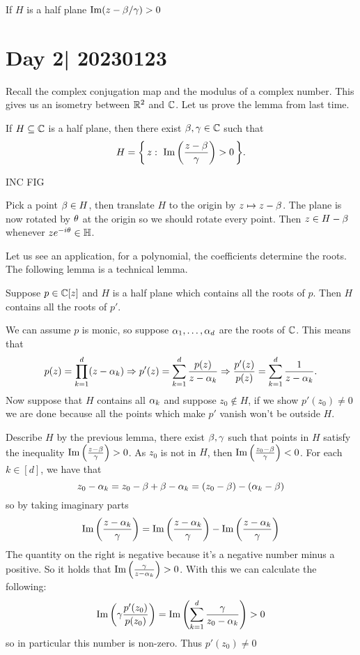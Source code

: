 \documentclass[12pt]{memoir}
\begin{document}
\begin{Lem}
    If $H$ is a half plane $\Im(z-\beta/\gamma)>0$
\end{Lem}

\section{Day 2| 20230123}

Recall the complex conjugation map and the modulus of a complex number. This gives us an isometry between $\mathbb{R}^2$ and $\mathbb{C}$. Let us prove the lemma from last time. 

\begin{Lem}
    If $H\subseteq\mathbb{C}$ is a half plane, then there exist $\beta,\gamma\in\mathbb{C}$ such that 
    $$H=\Set{z:\ \Im\left(\frac{z-\bt}{\ga}\right)>0}.$$
\end{Lem}
\begin{center}
    INC FIG
\end{center}
Pick a point $\beta\in H$, then translate $H$ to the origin by $z\mapsto z-\beta$. The plane is now rotated by $\theta$ at the origin so we should rotate every point. Then $z\in H-\beta$ whenever $ze^{-i\theta}\in\mathbb{H}$. \par 
Let us see an application, for a polynomial, the coefficients determine the roots. The following lemma is a technical lemma.

\begin{Lem}
    Suppose $p\in\mathbb{C}[z]$ and $H$ is a half plane which contains all the roots of $p$. Then $H$ contains all the roots of $p'$.
\end{Lem}

\begin{ptcbp}
    We can assume $p$ is monic, so suppose $\alpha_1,\dots,\alpha_d$ are the roots of $\mathbb{C}$. This means that 
    $$p(z)=\prod_{k=1}^d(z-\alpha_k)\Rightarrow p'(z)=\sum_{k=1}^d\frac{p(z)}{z-\alpha_k}\Rightarrow\frac{p'(z)}{p(z)}=\sum_{k=1}^d\frac{1}{z-\alpha_k}.$$
    Now suppose that $H$ contains all $\alpha_k$ and suppose $z_0\not\in H$, if we show $p'(z_0)\neq 0$ we are done because all the points which make $p'$ vanish won't be outside $H$.\par 
    Describe $H$ by the previous lemma, there exist $\beta,\gamma$ such that points in $H$ satisfy the inequality $\Im\left(\frac{z-\beta}{\gamma}\right)>0$. As $z_0$ is not in $H$, then $\Im\left(\frac{z_0-\beta}{\gamma}\right)<0$. For each $k\in[d]$, we have that 
    $$z_0-\alpha_k=z_0-\beta+\beta-\alpha_k=(z_0-\beta)-(\alpha_k-\beta)$$
    so by taking imaginary parts 
    $$\Im\left(\frac{z-\alpha_k}{\gamma}\right)=\Im\left(\frac{z-\alpha_k}{\gamma}\right)-\Im\left(\frac{z-\alpha_k}{\gamma}\right)$$ 
    The quantity on the right is negative because it's a negative number minus a positive. So it holds that $\Im\left(\frac{\gamma}{z-\alpha_k}\right)>0$. With this we can calculate the following:
    $$\Im\left(\gamma\frac{p'(z_0)}{p(z_0)}\right)=\Im\left(\sum_{k=1}^d\frac{\gamma}{z_0-\alpha_k}\right)>0$$
    so in particular this number is non-zero. Thus $p'(z_0)\neq 0$ 
\end{ptcbp}
\end{document}
